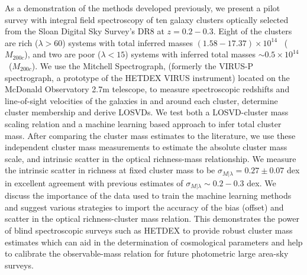 As a demonstration of the methods developed previously, we present a pilot survey with integral field spectroscopy of ten galaxy clusters optically selected from the Sloan Digital Sky Survey's DR8 at $z=0.2-0.3$. Eight of the clusters are rich ($\lambda>60$) systems with total inferred masses $(1.58-17.37) \times 10^{14}$ \Msol\ ($M_{200c}$), and two are poor ($\lambda<15$) systems with inferred total masses $\sim0.5 \times 10^{14}$ \Msol\ ($M_{200c}$). We use the Mitchell Spectrograph, (formerly the VIRUS-P spectrograph, a prototype of the HETDEX VIRUS instrument) located on the McDonald Observatory 2.7m telescope, to measure spectroscopic redshifts and line-of-sight velocities of the galaxies in and around each cluster, determine cluster membership and derive LOSVDs. We test both a LOSVD-cluster mass scaling relation and a machine learning based approach to infer total cluster mass. After comparing the cluster mass estimates to the literature, we use these independent cluster mass measurements to estimate the absolute cluster mass scale, and intrinsic scatter in the optical richness-mass relationship. We measure the intrinsic scatter in richness at fixed cluster mass to be $\sigma_{M|\lambda} = 0.27\pm0.07$ dex in excellent agreement with previous estimates of $\sigma_{M|\lambda} \sim 0.2-0.3$ dex. We discuss the importance of the data used to train the machine learning methods and suggest various strategies to import the accuracy of the bias (offset) and scatter in the optical richness-cluster mass relation. This demonstrates the power of blind spectroscopic surveys such as HETDEX to provide robust cluster mass estimates which can aid in the determination of cosmological parameters and help to calibrate the observable-mass relation for future photometric large area-sky surveys.
\pagebreak{}
